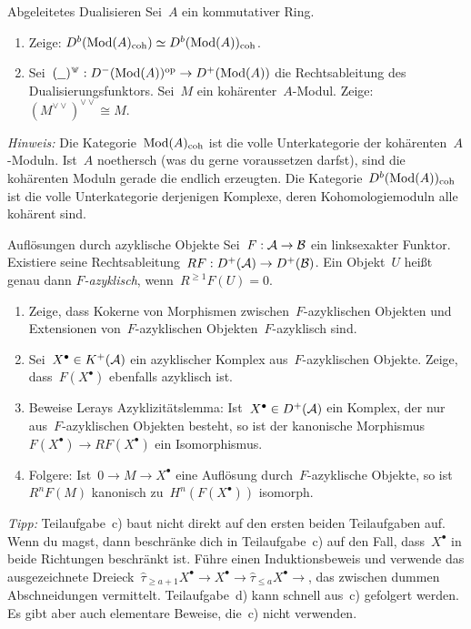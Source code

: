 \documentclass{uebblatt}
\newcommand{\dd}{{\vee\!\!\!\vee}}
\begin{document}

\begin{aufgabe}{Abgeleitetes Dualisieren}
Sei~$A$ ein kommutativer Ring.
\begin{enumerate}
\item Zeige: $D^b(\mathrm{Mod}(A)_\mathrm{coh}) \simeq D^b(\mathrm{Mod}(A))_\mathrm{coh}$.
\item Sei~$(\smallplaceholder)^\dd : D^-(\Mod(A))^\op \to D^+(\Mod(A))$ die
Rechtsableitung des Dualisierungsfunktors. Sei~$M$ ein kohärenter~$A$-Modul.
Zeige: $(M^\dd)^\dd \cong M$.
\end{enumerate}

{\tiny\emph{Hinweis:} Die Kategorie~$\mathrm{Mod}(A)_\mathrm{coh}$ ist die volle
Unterkategorie der kohärenten~$A$-Moduln. Ist~$A$ noethersch (was du gerne
voraussetzen darfst), sind die kohärenten Moduln gerade die endlich erzeugten.
Die Kategorie~$D^b(\mathrm{Mod}(A))_\mathrm{coh}$ ist die volle Unterkategorie
derjenigen Komplexe, deren Kohomologiemoduln alle kohärent sind.\par}
\end{aufgabe}

\begin{aufgabe}{Auflösungen durch azyklische Objekte}
Sei~$F : \mathcal{A} \to \mathcal{B}$ ein linksexakter Funktor. Existiere seine
Rechtsableitung~$RF : D^+(\mathcal{A}) \to D^+(\mathcal{B})$. Ein Objekt~$U$ heißt genau dann
\emph{$F$-azyklisch}, wenn~$R^{\geq 1}F(U) = 0$.
\begin{enumerate}
\item Zeige, dass Kokerne von Morphismen zwischen~$F$-azyklischen
Objekten und Extensionen von~$F$-azyklischen Objekten~$F$-azyklisch sind.
\item Sei~$X^\bullet \in K^+(\mathcal{A})$ ein azyklischer Komplex aus~$F$-azyklischen
Objekte. Zeige, dass~$F(X^\bullet)$ ebenfalls azyklisch ist.
\item Beweise Lerays Azyklizitätslemma: Ist~$X^\bullet \in D^+(\mathcal{A})$ ein Komplex, der nur
aus~$F$-azyklischen Objekten besteht, so ist der kanonische
Morphismus~$F(X^\bullet) \to RF(X^\bullet)$ ein Isomorphismus.
\item Folgere: Ist~$0 \to M \to X^\bullet$ eine Auflösung durch~$F$-azyklische
Objekte, so ist~$R^nF(M)$ kanonisch zu~$H^n(F(X^\bullet))$ isomorph.
\end{enumerate}

{\tiny\emph{Tipp:} Teilaufgabe~c) baut nicht direkt auf den ersten beiden
Teilaufgaben auf. Wenn du magst, dann beschränke dich in Teilaufgabe~c) auf den Fall,
dass~$X^\bullet$ in beide Richtungen beschränkt ist. Führe einen
Induktionsbeweis und verwende das ausgezeichnete Dreieck~$\hat\tau_{\geq a+1}
X^\bullet \to X^\bullet \to \hat\tau_{\leq a} X^\bullet \to$, das zwischen
dummen Abschneidungen vermittelt. Teilaufgabe~d) kann schnell aus~c) gefolgert
werden. Es gibt aber auch elementare Beweise, die~c) nicht verwenden.\par}
\end{aufgabe}
\end{document}
